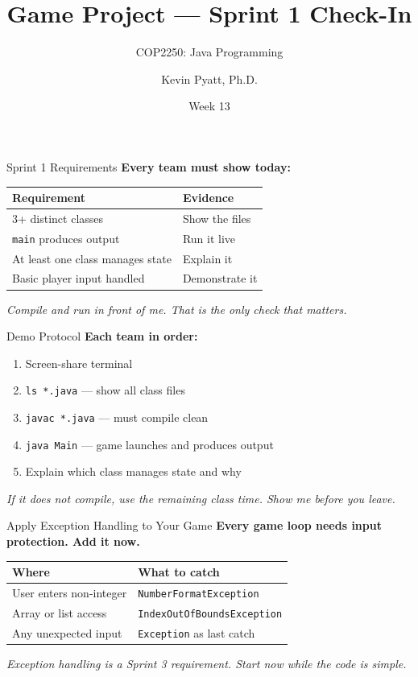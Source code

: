 \documentclass{beamer}
\title[Sprint 1 Check-In]{Game Project --- Sprint 1 Check-In}
\subtitle{COP2250: Java Programming}
\author{Kevin Pyatt, Ph.D.}
\institute{State College of Florida \\ Pyatt Labs}
\date{Week 13}
\begin{document}
\begin{frame}
  \titlepage
\end{frame}
\begin{frame}{Sprint 1 Requirements}
\textbf{Every team must show today:}
\vspace{0.3cm}
\begin{tabular}{ll}
\toprule
\textbf{Requirement} & \textbf{Evidence} \\
\midrule
3+ distinct classes & Show the files \\
\texttt{main} produces output & Run it live \\
At least one class manages state & Explain it \\
Basic player input handled & Demonstrate it \\
\bottomrule
\end{tabular}
\vspace{0.3cm}
\textit{Compile and run in front of me. That is the only check that matters.}
\end{frame}
\begin{frame}{Demo Protocol}
\textbf{Each team in order:}
\vspace{0.2cm}
\begin{enumerate}
  \item Screen-share terminal
  \item \texttt{ls *.java} --- show all class files
  \item \texttt{javac *.java} --- must compile clean
  \item \texttt{java Main} --- game launches and produces output
  \item Explain which class manages state and why
\end{enumerate}
\vspace{0.3cm}
\textit{If it does not compile, use the remaining class time. Show me before you leave.}
\end{frame}
\begin{frame}{Apply Exception Handling to Your Game}
\textbf{Every game loop needs input protection. Add it now.}
\begin{tabular}{ll}
\toprule
\textbf{Where} & \textbf{What to catch} \\
\midrule
User enters non-integer & \texttt{NumberFormatException} \\
Array or list access & \texttt{IndexOutOfBoundsException} \\
Any unexpected input & \texttt{Exception} as last catch \\
\bottomrule
\end{tabular}
\vspace{0.3cm}
\textit{Exception handling is a Sprint 3 requirement. Start now while the code is simple.}
\end{frame}
\end{document}
